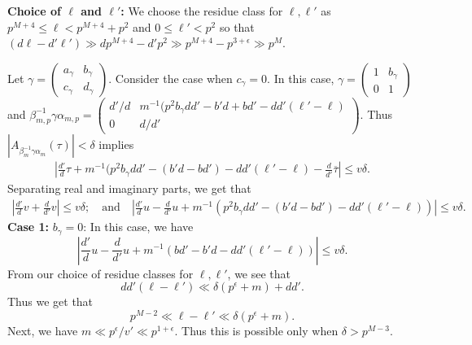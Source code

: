 \documentclass[11pt]{amsart}
\numberwithin{equation}{section}
\theoremstyle{plain}
\theoremstyle{definition}
\newcommand{\q}{\quad}
\newcommand{\smat}[4]{\left( \begin{smallmatrix}#1&#2\\#3&#4\end{smallmatrix}\right)}
\begin{document}
\textbf{Choice of $\ell$ and $\ell'$:} We choose the residue class for $\ell, \ell'$ as $p^{M+4}\le \ell < p^{M+4}+p^2$ and $0\le \ell' < p^2$ so that $(d\ell-d'\ell')\gg dp^{M+4}-d'p^2\gg p^{M+4}-p^{3+\epsilon}\gg p^M$.

Let $\gamma=\smat{a_\gamma}{b_\gamma}{c_\gamma}{d_\gamma}$. Consider the case when $c_\gamma=0$. In this case, $\gamma= \smat{1}{b_\gamma}{0}{1}$ and $\beta_{m,p}^{-1} \gamma \alpha_{m,p} =\smat{d'/d}{m^{-1}(p^2b_\gamma dd'-b'd+bd'-dd'(\ell'-\ell)}{0}{d/d'}$. Thus $|A_{\beta_m^{-1}\gamma\alpha_m}(\tau)|< \delta$ implies
\begin{align}
    \left|\frac{d'}{d}\tau+ m^{-1}(p^2b_\gamma dd'-(b'd-bd')-dd'(\ell'-\ell)- \frac{d}{d'}\overline{\tau}\right| \le v\delta.
\end{align}
Separating real and imaginary parts, we get that
\begin{align} 
    |\frac{d'}{d}v+ \frac{d}{d'}v|\le v\delta;\q\text{and}\q
    \left|\frac{d'}{d}u- \frac{d}{d'}u+ m^{-1}(p^2b_\gamma dd'-(b'd-bd')-dd'(\ell'-\ell))\right|\le v\delta. \label{b'-fixold}
\end{align}
\textbf{Case 1:} $b_\gamma=0$: In this case, we have
\begin{equation}
    \left|\frac{d'}{d}u- \frac{d}{d'}u+ m^{-1}(bd'-b'd-dd'(\ell'-\ell))\right|\le v\delta.
\end{equation}
From our choice of residue classes for $\ell, \ell'$, we see that
\begin{equation}
    dd'(\ell-\ell') \ll \delta(p^\epsilon+m)+dd'.
\end{equation}
Thus we get that
\begin{equation}
    p^{M-2}\ll \ell-\ell'\ll \delta(p^\epsilon+m).
\end{equation}
Next, we have $m\ll p^\epsilon/v'\ll p^{1+\epsilon}$. Thus this is possible only when $\delta> p^{M-3}$. 
\end{document}
